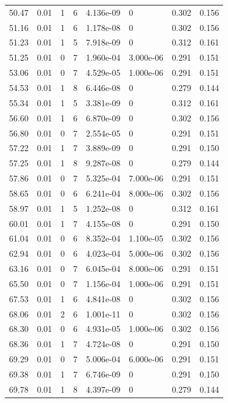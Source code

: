 \documentclass[preview]{standalone}
\begin{document}
{{{\begin{tabular}{L{1.2cm}C{1.2cm} C{0.3cm}C{0.5cm} C{1.4cm}C{1.4cm} C{1.4cm}C{1.4cm}}
  50.47  &  0.01  & 1     &  6 &  4.136e-09  & 0  & 0.302 &  0.156   \\ 
  51.16  &  0.01  & 1     &  6 &  1.178e-08  & 0  & 0.302 &  0.156   \\ 
  51.23  &  0.01  & 1     &  5 &  7.918e-09  & 0  & 0.312 &  0.161   \\ 
  51.25  &  0.01  & 0     &  7 &  1.960e-04  & 3.000e-06  & 0.291 &  0.151   \\ 
  53.06  &  0.01  & 0     &  7 &  4.529e-05  & 1.000e-06  & 0.291 &  0.151   \\ 
  54.53  &  0.01  & 1     &  8 &  6.446e-08  & 0  & 0.279 &  0.144   \\ 
  55.34  &  0.01  & 1     &  5 &  3.381e-09  & 0  & 0.312 &  0.161   \\ 
  56.60  &  0.01  & 1     &  6 &  6.870e-09  & 0  & 0.302 &  0.156   \\ 
  56.80  &  0.01  & 0     &  7 &  2.554e-05  & 0  & 0.291 &  0.151   \\ 
  57.22  &  0.01  & 1     &  7 &  3.889e-09  & 0  & 0.291 &  0.150   \\ 
  57.25  &  0.01  & 1     &  8 &  9.287e-08  & 0  & 0.279 &  0.144   \\ 
  57.86  &  0.01  & 0     &  7 &  5.325e-04  & 7.000e-06  & 0.291 &  0.151   \\ 
  58.65  &  0.01  & 0     &  6 &  6.241e-04  & 8.000e-06  & 0.302 &  0.156   \\ 
  58.97  &  0.01  & 1     &  5 &  1.252e-08  & 0  & 0.312 &  0.161   \\ 
  60.01  &  0.01  & 1     &  7 &  4.155e-08  & 0  & 0.291 &  0.150   \\ 
  61.04  &  0.01  & 0     &  6 &  8.352e-04  & 1.100e-05  & 0.302 &  0.156   \\ 
  62.94  &  0.01  & 0     &  6 &  4.023e-04  & 5.000e-06  & 0.302 &  0.156   \\ 
  63.16  &  0.01  & 0     &  7 &  6.045e-04  & 8.000e-06  & 0.291 &  0.151   \\ 
  65.50  &  0.01  & 0     &  7 &  1.156e-04  & 1.000e-06  & 0.291 &  0.151   \\ 
  67.53  &  0.01  & 1     &  6 &  4.841e-08  & 0  & 0.302 &  0.156   \\ 
  68.06  &  0.01  & 2     &  6 &  1.001e-11  & 0  & 0.302 &  0.156   \\ 
  68.30  &  0.01  & 0     &  6 &  4.931e-05  & 1.000e-06  & 0.302 &  0.156   \\ 
  68.36  &  0.01  & 1     &  7 &  4.724e-08  & 0  & 0.291 &  0.150   \\ 
  69.29  &  0.01  & 0     &  7 &  5.006e-04  & 6.000e-06  & 0.291 &  0.151   \\ 
  69.38  &  0.01  & 1     &  7 &  6.746e-09  & 0  & 0.291 &  0.150   \\ 
  69.78  &  0.01  & 1     &  8 &  4.397e-09  & 0  & 0.279 &  0.144   \\ 
\hline 
\end{tabular} 

}}}
\end{document}
